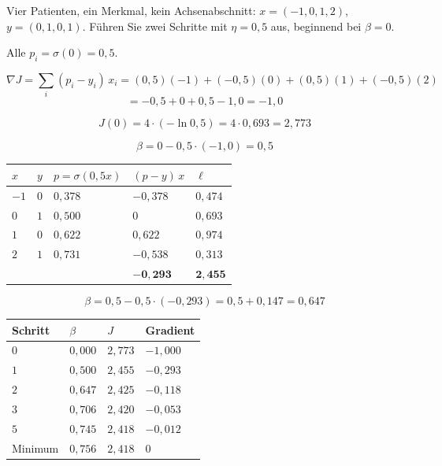 \begin{aufgabe}
Vier Patienten, ein Merkmal, kein Achsenabschnitt: $x = (-1, 0, 1, 2)$, $y = (0, 1, 0, 1)$. Führen Sie zwei Schritte mit $\eta = 0{,}5$ aus, beginnend bei $\beta = 0$.

\loesung
{}
Alle $p_i = \sigma(0) = 0{,}5$.

\[ \nabla J = \sum_i (p_i-y_i)\,x_i = (0{,}5)(-1) + (-0{,}5)(0) + (0{,}5)(1) + (-0{,}5)(2) \]
\[ = -0{,}5 + 0 + 0{,}5 - 1{,}0 = -1{,}0 \]

\[ J(0) = 4\cdot(-\ln0{,}5) = 4\cdot0{,}693 = 2{,}773 \]

\[ \beta = 0 - 0{,}5\cdot(-1{,}0) = 0{,}5 \]

\begin{center}
{\small
\renewcommand{\arraystretch}{1.46}
\begin{tabular}{@{}P{1.0cm}P{1.0cm}P{1.8cm}P{2.0cm}P{2.0cm}@{}}
\toprule
$x$ & $y$ & $p = \sigma(0{,}5x)$ & $(p-y)\,x$ & $\ell$\\
\midrule
$-1$ & $0$ & $0{,}378$ & $-0{,}378$ & $0{,}474$\\
$0$ & $1$ & $0{,}500$ & $0$ & $0{,}693$\\
$1$ & $0$ & $0{,}622$ & $0{,}622$ & $0{,}974$\\
$2$ & $1$ & $0{,}731$ & $-0{,}538$ & $0{,}313$\\
\midrule
& & & $\mathbf{-0{,}293}$ & $\mathbf{2{,}455}$\\
\bottomrule
\end{tabular}}
\end{center}

\[ \beta = 0{,}5 - 0{,}5\cdot(-0{,}293) = 0{,}5+0{,}147 = 0{,}647 \]

\begin{center}
{\small
\renewcommand{\arraystretch}{1.46}
\begin{tabular}{@{}P{1.6cm}P{1.8cm}P{1.8cm}P{2.0cm}@{}}
\toprule
\textbf{Schritt} & $\beta$ & $J$ & \textbf{Gradient}\\
\midrule
$0$ & $0{,}000$ & $2{,}773$ & $-1{,}000$\\
$1$ & $0{,}500$ & $2{,}455$ & $-0{,}293$\\
$2$ & $0{,}647$ & $2{,}425$ & $-0{,}118$\\
$3$ & $0{,}706$ & $2{,}420$ & $-0{,}053$\\
$5$ & $0{,}745$ & $2{,}418$ & $-0{,}012$\\
\midrule
Minimum & $0{,}756$ & $2{,}418$ & $0$\\
\bottomrule
\end{tabular}}
\end{center}


\end{aufgabe}
